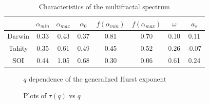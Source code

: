 \documentclass[onecolumn, preprint,aps,amsmath, amssymb, superscriptaddress]{revtex4}
\begin{document}
\begin{table}[t]
\begin{center}
\begin{tabular}{ c  c  c  c  c  c  c  c }
\hline

   & $\alpha_{min}$  & $\alpha_{max}$ & $\alpha_0$ & $f(\alpha_{min})$ & $f(\alpha_{max})$ & $\omega$& $a_s$ \\ \hline
Darwin   & 0.33  & 0.43  & 0.37  & 0.81 &  0.70 &  0.10 &  0.11 \\
Tahity     & 0.35  & 0.61  & 0.49  & 0.45 &  0.52 &  0.26 &  -0.07 \\
SOI     & 0.44  & 1.05  & 0.68  & 0.30 &  0.06 &  0.61 &  0.24 \\
\hline
\end{tabular}
\caption{Characteristics of the multifractal spectrum}
\label{tab:mfdfa}
\end{center}
\end{table}


\begin{figure}
\caption{$q$ dependence of the generalized Hurst exponent}
\label{fig:H}
\end{figure}

\begin{figure}
\caption{Plots of $\tau(q)$ vs $q$}
\label{fig:tau}
\end{figure}
\end{document}
